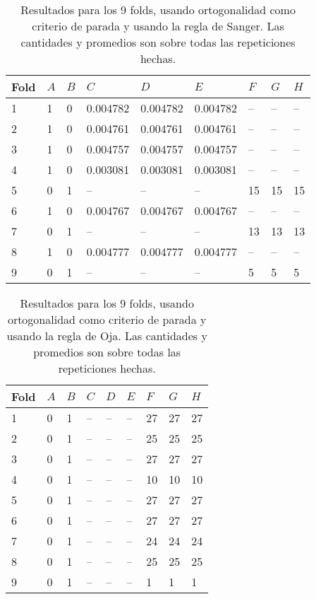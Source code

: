 \documentclass[informe.tex]{subfiles}
\begin{document}
      
      
      \begin{table}[h]
	\centering
	\begin{tabular}{|l|l|l|l|l|l|l|l|l|} \hline
	Fold & $A$ & $B$ & $C$ & $D$ & $E$ & $F$ & $G$ & $H$ \\ \hline
	1& 1 & 0 & 0.004782 & 0.004782 & 0.004782 & -- & -- & -- \\ \hline
	2& 1 & 0 & 0.004761 & 0.004761 & 0.004761 & -- & -- & -- \\ \hline
	3& 1 & 0 & 0.004757 & 0.004757 & 0.004757 & -- & -- & -- \\ \hline
	4& 1 & 0 & 0.003081 & 0.003081 & 0.003081 & -- & -- & -- \\ \hline
	5& 0 & 1 & -- & -- & -- & 15 & 15 & 15 \\ \hline
	6& 1 & 0 & 0.004767 & 0.004767 & 0.004767 & -- & -- & -- \\ \hline
	7& 0 & 1 & -- & -- & -- & 13 & 13 & 13 \\ \hline
	8& 1 & 0 & 0.004777 & 0.004777 & 0.004777 & -- & -- & -- \\ \hline
	9& 0 & 1 & -- & -- & -- & 5 & 5 & 5 \\ \hline
	\end{tabular}
	\caption{Resultados para los 9 folds, usando ortogonalidad como criterio de parada y usando la regla de Sanger. Las cantidades y promedios son sobre todas las repeticiones hechas.}
	\label{tab:ortogonalidad_sanger}
      \end{table}

      
      \begin{table}[h]
	\centering
	\begin{tabular}{|l|l|l|l|l|l|l|l|l|} \hline
	Fold & $A$ & $B$ & $C$ & $D$ & $E$ & $F$ & $G$ & $H$ \\ \hline
	1& 0 & 1 & -- & -- & -- & 27 & 27 & 27 \\ \hline
	2& 0 & 1 & -- & -- & -- & 25 & 25 & 25 \\ \hline
	3& 0 & 1 & -- & -- & -- & 27 & 27 & 27 \\ \hline
	4& 0 & 1 & -- & -- & -- & 10 & 10 & 10 \\ \hline
	5& 0 & 1 & -- & -- & -- & 27 & 27 & 27 \\ \hline
	6& 0 & 1 & -- & -- & -- & 27 & 27 & 27 \\ \hline
	7& 0 & 1 & -- & -- & -- & 24 & 24 & 24 \\ \hline
	8& 0 & 1 & -- & -- & -- & 25 & 25 & 25 \\ \hline
	9& 0 & 1 & -- & -- & -- & 1 & 1 & 1 \\ \hline
	\end{tabular}
	\caption{Resultados para los 9 folds, usando ortogonalidad como criterio de parada y usando la regla de Oja. Las cantidades y promedios son sobre todas las repeticiones hechas.}
	\label{tab:ortogonalidad_oja}
      \end{table}
\end{document}
